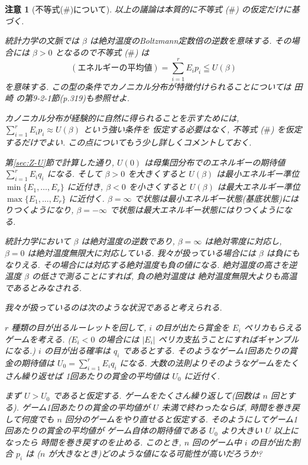 \documentclass[12pt,twoside]{jarticle}
\theoremstyle{jplain}
\theoremstyle{jplain}
\theoremstyle{jplain}
\newtheorem{remark}[theorem]{注意}
\numberwithin{theorem}{section}
\numberwithin{equation}{section}
\numberwithin{figure}{section}
\numberwithin{table}{section}
\newcommand\secref[1]{第\ref{#1}節}
\begin{document}
\begin{remark}[不等式($\#$)について]
\label{remark:beta}
以上の議論は本質的に不等式 ($\#$) の仮定だけに基づく.

統計力学の文脈では $\beta$ は絶対温度のBoltzmann定数倍の逆数を意味する.
その場合には $\beta>0$ となるので不等式 ($\#$) は
\[
(\text{エネルギーの平均値})=\sum_{i=1}^r E_i p_i\leqq U(\beta)
\]
を意味する. 
この型の条件でカノニカル分布が特徴付けられることについては
田崎 \cite{Tasaki}の第9-2-1節(p.319)も参照せよ.

カノニカル分布が経験的に自然に得られることを示すためには, 
$\sum_{i=1}^r E_i p_i\approx U(\beta)$ という強い条件を
仮定する必要はなく, 不等式 ($\#$) を仮定するだけでよい.
この点についてもう少し詳しくコメントしておく.

\secref{sec:Z-U}で計算した通り,
$U(0)$ は母集団分布でのエネルギーの期待値 $\sum_{i=1}^r E_i q_i$ になる.
そして $\beta>0$ を大きくすると 
$U(\beta)$ は最小エネルギー準位 $\min\{E_1,\ldots,E_r\}$ に近付き, 
$\beta<0$ を小さくすると 
$U(\beta)$ は最大エネルギー準位 $\max\{E_1,\ldots,E_r\}$ に近付く.
$\beta=\infty$ で状態は最小エネルギー状態(基底状態)にはりつくようになり,
$\beta=-\infty$ で状態は最大エネルギー状態にはりつくようになる.

統計力学において $\beta$ は絶対温度の逆数であり, 
$\beta=\infty$ は絶対零度に対応し, 
$\beta=0$ は絶対温度無限大に対応している.
我々が扱っている場合には $\beta$ は負にもなりえる.
その場合には対応する絶対温度も負の値になる.
絶対温度の高さを逆温度 $\beta$ の低さで測ることにすれば, 負の絶対温度は
絶対温度無限大よりも高温であるとみなされる.

我々が扱っているのは次のような状況であると考えられる.

$r$ 種類の目が出るルーレットを回して, 
$i$ の目が出たら賞金を $E_i$ ペリカもらえるゲームを考える.
($E_i<0$ の場合には $|E_i|$ ペリカ支払うことにすればギャンブルになる.)
$i$ の目が出る確率は $q_i$ であるとする.
そのようなゲーム1回あたりの賞金の期待値は $U_0=\sum_{i=1}^r E_i q_i$ になる.
大数の法則よりそのようなゲームをたくさん繰り返せば
1回あたりの賞金の平均値は $U_0$ に近付く.

まず $U>U_0$ であると仮定する.
ゲームをたくさん繰り返して(回数は $n$ 回とする). 
ゲーム1回あたりの賞金の平均値が $U$ 未満で終わったならば, 
時間を巻き戻して何度でも $n$ 回分のゲームをやり直せると仮定する.
そのようにしてゲーム1回あたりの賞金の平均値が
ゲーム自体の期待値である $U_0$ より大きい $U$ 以上になったら
時間を巻き戻すのを止める.
このとき, $n$ 回のゲーム中 $i$ の目が出た割合 $p_i$ は
($n$ が大きなとき)どのような値になる可能性が高いだろうか?


\end{remark}
\end{document}
